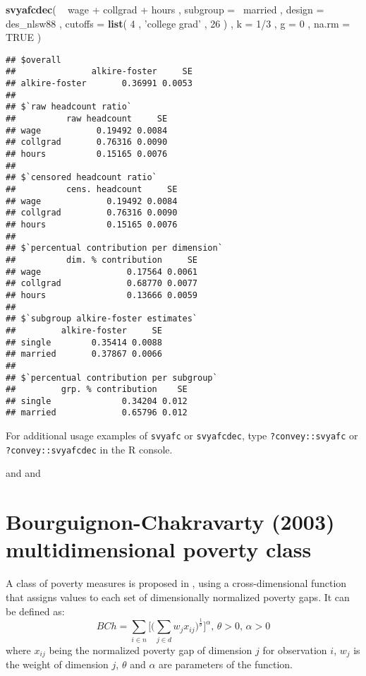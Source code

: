 \documentclass[]{book}
\newenvironment{Shaded}{\begin{snugshade}}{\end{snugshade}}
\newcommand{\KeywordTok}[1]{\textcolor[rgb]{0.13,0.29,0.53}{\textbf{{#1}}}}
\newcommand{\DataTypeTok}[1]{\textcolor[rgb]{0.13,0.29,0.53}{{#1}}}
\newcommand{\DecValTok}[1]{\textcolor[rgb]{0.00,0.00,0.81}{{#1}}}
\newcommand{\StringTok}[1]{\textcolor[rgb]{0.31,0.60,0.02}{{#1}}}
\newcommand{\OtherTok}[1]{\textcolor[rgb]{0.56,0.35,0.01}{{#1}}}
\newcommand{\NormalTok}[1]{{#1}}
\begin{document}
\begin{Shaded}
\begin{Highlighting}[]
\KeywordTok{svyafcdec}\NormalTok{(}
    \NormalTok{~}\StringTok{ }\NormalTok{wage +}\StringTok{ }\NormalTok{collgrad +}\StringTok{ }\NormalTok{hours , }
    \DataTypeTok{subgroup =} \NormalTok{~married , }
    \DataTypeTok{design =} \NormalTok{des_nlsw88 , }
    \DataTypeTok{cutoffs =} \KeywordTok{list}\NormalTok{( }\DecValTok{4} \NormalTok{, }\StringTok{'college grad'} \NormalTok{, }\DecValTok{26} \NormalTok{) , }
    \DataTypeTok{k =} \DecValTok{1}\NormalTok{/}\DecValTok{3} \NormalTok{, }
    \DataTypeTok{g =} \DecValTok{0} \NormalTok{,}
    \DataTypeTok{na.rm =} \OtherTok{TRUE}
\NormalTok{)}
\end{Highlighting}
\end{Shaded}

\begin{verbatim}
## $overall
##               alkire-foster     SE
## alkire-foster       0.36991 0.0053
## 
## $`raw headcount ratio`
##          raw headcount     SE
## wage           0.19492 0.0084
## collgrad       0.76316 0.0090
## hours          0.15165 0.0076
## 
## $`censored headcount ratio`
##          cens. headcount     SE
## wage             0.19492 0.0084
## collgrad         0.76316 0.0090
## hours            0.15165 0.0076
## 
## $`percentual contribution per dimension`
##          dim. % contribution     SE
## wage                 0.17564 0.0061
## collgrad             0.68770 0.0077
## hours                0.13666 0.0059
## 
## $`subgroup alkire-foster estimates`
##         alkire-foster     SE
## single        0.35414 0.0088
## married       0.37867 0.0066
## 
## $`percentual contribution per subgroup`
##         grp. % contribution    SE
## single              0.34204 0.012
## married             0.65796 0.012
\end{verbatim}

For additional usage examples of \texttt{svyafc} or \texttt{svyafcdec},
type \texttt{?convey::svyafc} or \texttt{?convey::svyafcdec} in the R
console.

\citep{alkire2011} and \citep{alkire2015} and \citep{pacifico2016}

\section{Bourguignon-Chakravarty (2003) multidimensional poverty
class}\label{bourguignon-chakravarty-2003-multidimensional-poverty-class}

A class of poverty measures is proposed in \citet{bourguignon2003},
using a cross-dimensional function that assigns values to each set of
dimensionally normalized poverty gaps. It can be defined as: \[
BCh = \sum_{i \in n} \bigg[ \bigg( \sum_{j \in d} w_{j} x_{ij} \bigg)^{\frac{1}{\theta}} \bigg]^\alpha \text{, } \theta > 0 \text{, } \alpha > 0
\] where \(x_{ij}\) being the normalized poverty gap of dimension \(j\)
for observation \(i\), \(w_j\) is the weight of dimension \(j\),
\(\theta\) and \(\alpha\) are parameters of the function.
\end{document}
